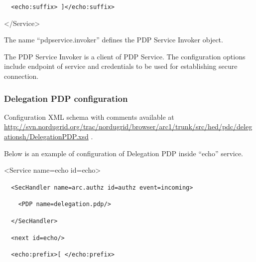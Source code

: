 \documentclass{article}
\begin{document}
{\upshape\color{black}
\foreignlanguage{spanish}{\texttt{\ \ }}\texttt{{\textless}echo:suffix{\textgreater}
]{\textless}/echo:suffix{\textgreater}}}

{\ttfamily\color{black}
{\textless}/Service{\textgreater}}

{\upshape\color{black}
The name {\textquotedblleft}pdpservice.invoker{\textquotedblright}
defines the PDP Service Invoker object.}

{\color{black}
The PDP Service Invoker is a client of PDP Service. The configuration
options include endpoint of service and credentials to be used for
establishing secure connection.}


\bigskip

\subsubsection{Delegation PDP configuration}
{\upshape\color{black}
Configuration XML schema with comments available at
\url{http://svn.nordugrid.org/trac/nordugrid/browser/arc1/trunk/src/hed/pdc/delegationsh/DelegationPDP.xsd}
.}

{\upshape\color{black}
Below is an example of configuration of Delegation PDP inside
{\textquotedblleft}echo{\textquotedblright} service.}

{\ttfamily\color{black}
{\textless}Service name={\textquotedbl}echo{\textquotedbl}
id={\textquotedbl}echo{\textquotedbl}{\textgreater}}

{\upshape\color{black}
\foreignlanguage{spanish}{\texttt{\ \ }}\texttt{{\textless}SecHandler
name={\textquotedbl}arc.authz{\textquotedbl}
id={\textquotedbl}authz{\textquotedbl}
event={\textquotedbl}incoming{\textquotedbl}{\textgreater}}}

{\upshape\color{black}
\texttt{\ \ \ \ {\textless}PDP
name={\textquotedbl}delegation.pdp{\textquotedbl}/{\textgreater}}}

{\upshape\color{black}
\texttt{\ \ {\textless}/SecHandler{\textgreater}}}

{\upshape\color{black}
\texttt{\ \ {\textless}next
id={\textquotedbl}echo{\textquotedbl}/{\textgreater}}}

{\upshape\color{black}
\texttt{\ \ }\foreignlanguage{spanish}{\texttt{{\textless}echo:prefix{\textgreater}[
{\textless}/echo:prefix{\textgreater}}}}
\end{document}

